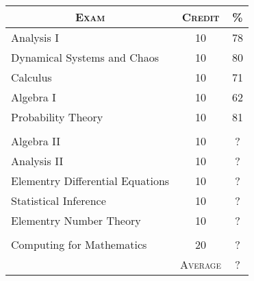 \documentclass[a4paper]{article}
\begin{document}
\begin{center}
\begin{tabular}{lcc}

\multicolumn{1}{c}{\textsc{Exam}} & \textsc{Credit}&\textsc{\%}\\ \hline
Analysis I & 10 & 78\\
Dynamical Systems and Chaos & 10 & 80\\
Calculus & 10 & 71\\
Algebra I & 10 & 62\\
Probability Theory & 10 & 81\\
\\
Algebra II & 10 & ?\\
Analysis II & 10 & ?\\
Elementry Differential Equations & 10 & ?\\
Statistical Inference & 10 & ?\\
Elementry Number Theory & 10 & ?\\
\\
Computing for Mathematics & 20 & ?\\
\cline{2-3}
&\textsc{Average}&?

\end{tabular}
\end{center}
\bigskip
\end{document}
